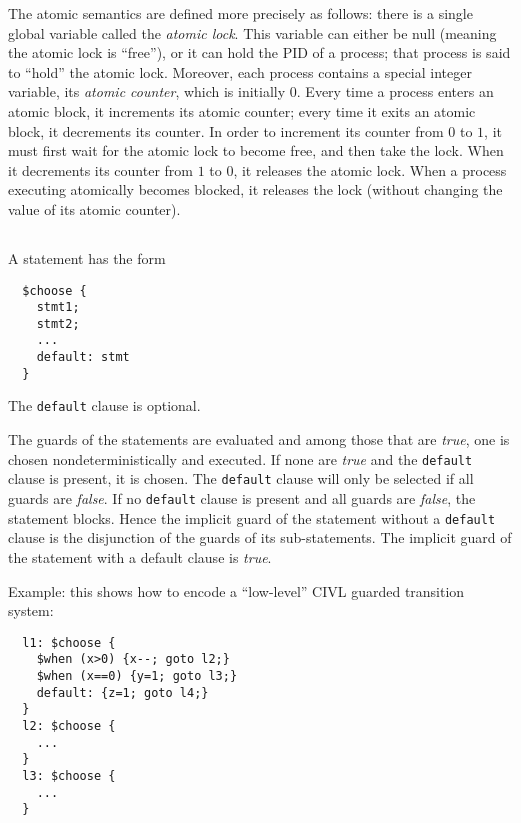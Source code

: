 The atomic semantics are defined more precisely as follows: there is a
single global variable called the \emph{atomic lock}. This variable
can either be null (meaning the atomic lock is ``free''), or it can
hold the PID of a process; that process is said to ``hold'' the atomic
lock.  Moreover, each process contains a special integer variable, its
\emph{atomic counter}, which is initially 0.  Every time a process
enters an atomic block, it increments its atomic counter; every time
it exits an atomic block, it decrements its counter.  In order to
increment its counter from $0$ to $1$, it must first wait for the
atomic lock to become free, and then take the lock.  When it
decrements its counter from $1$ to $0$, it releases the atomic lock.
When a process executing atomically becomes blocked, it releases the
lock (without changing the value of its atomic counter).

\subsection{\cchoose}  A \cchoose{} statement has the form
\begin{verbatim}
  $choose {
    stmt1;
    stmt2;
    ...
    default: stmt
  }
\end{verbatim}
The \texttt{default} clause is optional.

The guards of the statements are evaluated and among those that are
\emph{true}, one is chosen nondeterministically and executed.  If none
are \emph{true} and the \texttt{default} clause is present, it is
chosen.  The \texttt{default} clause will only be selected if all
guards are \emph{false}.  If no \texttt{default} clause is present and
all guards are \emph{false}, the statement blocks.  Hence the implicit
guard of the \cchoose{} statement without a \texttt{default} clause is
the disjunction of the guards of its sub-statements.  The implicit
guard of the \cchoose{} statement with a default clause is
\emph{true}.

Example: this shows how to encode a ``low-level'' CIVL guarded
transition system:

\begin{verbatim}
  l1: $choose {
    $when (x>0) {x--; goto l2;}
    $when (x==0) {y=1; goto l3;}
    default: {z=1; goto l4;}
  }
  l2: $choose {
    ...
  }
  l3: $choose {
    ...
  }
\end{verbatim}


